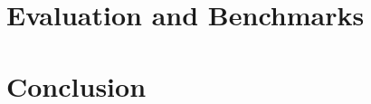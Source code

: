\documentclass[a4paper,10pt]{article}
\begin{document}

% 
% 
% 
% 
% 
% 



\section{Evaluation and Benchmarks}


%

\section{Conclusion}


\begin{appendix}


\end{appendix}

\todos
\end{document}
